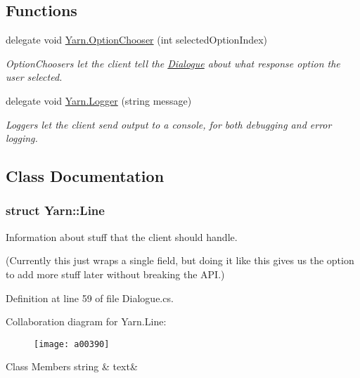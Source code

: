 \subsection*{Functions}
\begin{DoxyCompactItemize}
\item 
delegate void \hyperlink{a00051_a39866cbb03c03a35805d598b5d4ad553}{Yarn.\-Option\-Chooser} (int selected\-Option\-Index)
\begin{DoxyCompactList}\small\item\em Option\-Choosers let the client tell the \hyperlink{a00092}{Dialogue} about what response option the user selected. \end{DoxyCompactList}\item 
delegate void \hyperlink{a00051_a1e50031b945a3a2afafee6f590730568}{Yarn.\-Logger} (string message)
\begin{DoxyCompactList}\small\item\em Loggers let the client send output to a console, for both debugging and error logging. \end{DoxyCompactList}\end{DoxyCompactItemize}


\subsection{Class Documentation}
\label{a00377}
\hypertarget{a00051_a00377}{}
\subsubsection{struct Yarn\-:\-:Line}
Information about stuff that the client should handle. 

(Currently this just wraps a single field, but doing it like this gives us the option to add more stuff later without breaking the A\-P\-I.) 

Definition at line 59 of file Dialogue.\-cs.



Collaboration diagram for Yarn.\-Line\-:
\nopagebreak
\begin{figure}[H]
\begin{center}
\leavevmode
\texttt{[image: a00390]}
\end{center}
\end{figure}
\begin{DoxyFields}{Class Members}
\hypertarget{a00051_a81d1f04bbb4cf6642d2bd685bda1da20}{string}\label{a00051_a81d1f04bbb4cf6642d2bd685bda1da20}
&
text&
\\
\hline

\end{DoxyFields}
\label{a00380}
\hypertarget{a00051_a00380}{}
